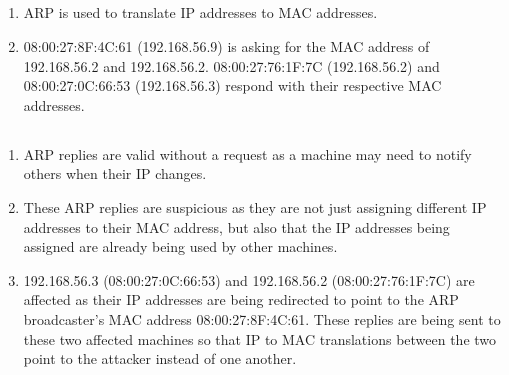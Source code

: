 \documentclass[12pt]{exam}
\begin{document}
\subsection{}

\begin{enumerate}[label=\alph*)]
    \item ARP is used to translate IP addresses to MAC addresses.
    \item 08:00:27:8F:4C:61 (192.168.56.9) is asking for the MAC address of
    192.168.56.2 and 192.168.56.2.  08:00:27:76:1F:7C (192.168.56.2) and
    08:00:27:0C:66:53 (192.168.56.3) respond with their respective MAC addresses.
\end{enumerate}

\subsection{}

\begin{enumerate}[label=\alph*)]
    \item ARP replies are valid without a request as a machine may need to
    notify others when their IP changes.
    \item These ARP replies are suspicious as they are not just assigning
    different IP addresses to their MAC address, but also that the IP addresses
    being assigned are already being used by other machines.
    \item 192.168.56.3 (08:00:27:0C:66:53) and 192.168.56.2 (08:00:27:76:1F:7C)
    are affected as their IP addresses are being redirected to point to the ARP
    broadcaster's MAC address 08:00:27:8F:4C:61.  These replies are being sent
    to these two affected machines so that IP to MAC translations between the
    two point to the attacker instead of one another.

\end{enumerate}

\subsection{}
\end{document}
